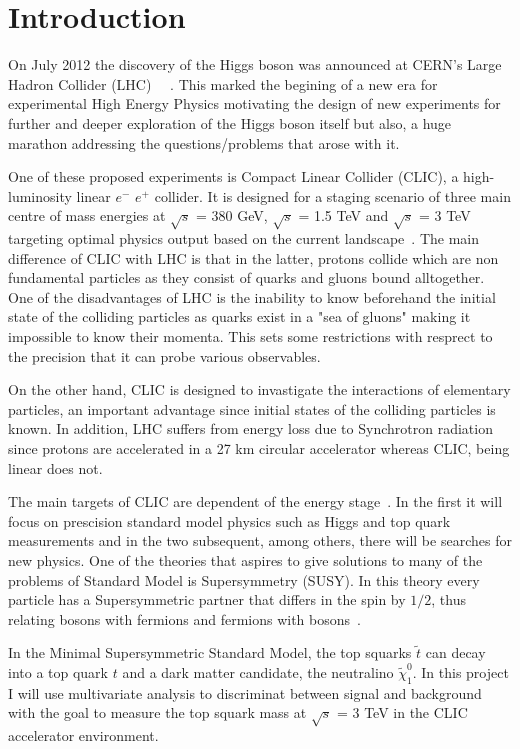 \documentclass[12pt,a4paper]{report}
\begin{document}

\chapter{Introduction}

On July 2012 the discovery of the Higgs boson was announced at CERN's Large Hadron Collider (LHC)~\cite{aad2012observation}
~\cite{higgs1966spontaneous}. 
This marked the begining of a new era for experimental High Energy Physics motivating the design of new 
experiments for further and deeper exploration of the Higgs boson itself but also, a huge marathon
addressing the questions/problems that arose with it. 

One of these proposed experiments is Compact Linear Collider (CLIC), a high-luminosity linear $e^{-}$ $e^{+}$ collider. It is designed for a staging scenario of three main centre of mass energies at $\surd{s}$ = 380 GeV, $\surd{s}$ = 1.5 TeV
and $\surd{s}$ = 3 TeV targeting optimal physics output based on the current landscape~\cite{clic2016updated}. 
The main difference of CLIC with LHC is that in the latter, protons collide which are non fundamental particles as they consist of quarks and 
gluons bound alltogether. One of the disadvantages of LHC is the inability to know beforehand the initial state of the colliding particles as quarks exist in a "sea of gluons" making it impossible to know their momenta. This sets
some restrictions with resprect to the precision that it can probe various observables.

On the other hand, CLIC is designed to invastigate the interactions of elementary particles, an important advantage since initial states of the colliding particles is known. In addition, LHC suffers from energy loss due to 
Synchrotron radiation since protons are accelerated in a 27 km circular accelerator whereas CLIC, being linear does not.

The main targets of CLIC are dependent of the energy stage~\cite{clic2016updated}.
In the first it will focus on prescision standard model physics such as Higgs and top quark measurements and in the two subsequent, among others, there will be searches
for new physics. One of the theories that aspires to give solutions to many of the problems of Standard Model is Supersymmetry (SUSY). In this theory every particle has a Supersymmetric partner that differs in the spin by $1/2$, thus 
relating bosons with fermions and fermions with bosons~\cite{bilal2001introduction}.

In the Minimal Supersymmetric Standard Model, the top squarks $\tilde{t}$ can decay into a top quark $t$
and a dark matter candidate, the neutralino $\tilde{\chi}_{1}^{0}$. In this project I will use multivariate analysis
to discriminat between signal and background with the goal to measure the top squark
mass at $\surd{s}$ = 3 TeV in the CLIC accelerator environment.
\end{document}
